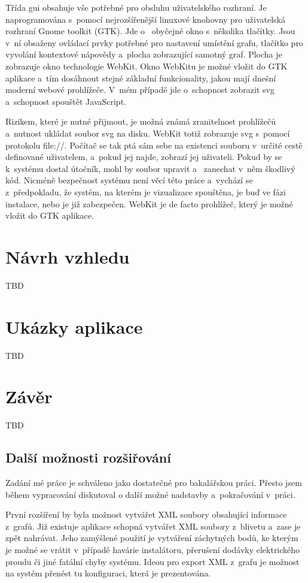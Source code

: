 \documentclass[color,table,oneside,nolot,nolof]{fithesis}
\begin{document}
	Třída gui obsahuje vše potřebné pro obsluhu uživatelského rozhraní. Je naprogramována s~pomocí nejrozšířenější linuxové knohovny pro uživatelská rozhraní Gnome toolkit (GTK). Jde o~
	obyčejné okno s~několika tlačítky. Jsou v~ní obsaženy ovládací prvky potřebné pro nastavení umístění grafu, tlačítko pro vyvolání kontextové
	nápovědy a~plocha zobrazující samotný graf. Plocha je zobrazuje okno technologie WebKit. Okno WebKitu je možné vložit do GTK aplikace a~tím dosáhnout stejné základní funkcionality,
	jakou mají dnešní moderní webové prohlížeče. V~mém případě jde o~schopnost zobrazit svg a~schopnost spouštět JavaScript.

	Rizikem, které je nutné přijmout, je možná známá zranitelnost prohlížečů a~nutnost ukládat soubor svg na disku. WebKit totiž zobrazuje svg s~pomocí protokolu file://. Počítač se
	tak ptá sám sebe na existenci souboru v~určité cestě definované uživatelem, a~pokud jej najde, zobrazí jej uživateli. Pokud by se k~systému dostal útočník, mohl by soubor upravit a~
	zanechat v~něm škodlivý kód. Nicméně bezpečnost systému není věcí této práce a~vychází se z~předpokladu, že systém, na kterém je vizualizace spouštěna, je buď ve fázi instalace, nebo
	je již zabezpečen. WebKit je de facto prohlížeč, který je možné vložit do GTK aplikace.

\chapter{Návrh vzhledu}
TBD

\chapter{Ukázky aplikace}
TBD

\chapter{Závěr}
TBD
\section{Další možnosti rozšiřování}
	Zadání mé práce je schváleno jako dostatečné pro bakalářskou práci. Přesto jsem během vypracování diskutoval o další možné nadstavby a~pokračování v~práci.

	První rozšíření by byla možnost vytvářet XML soubory obsahující informace z~grafů. Již existuje aplikace schopná vytvářet XML soubory z~blivetu a~zase je zpět nahrávat. Jeho zamýšlené
	použití je vytváření záchytných bodů, ke kterým je možné se vrátit v~případě havárie instalátoru, přerušení dodávky elektrického proudu či jiné fatální chyby systému. Ideou pro export
	XML z~grafu je možnost na systém přenést tu konfiguraci, která je prezentována.
\end{document}
